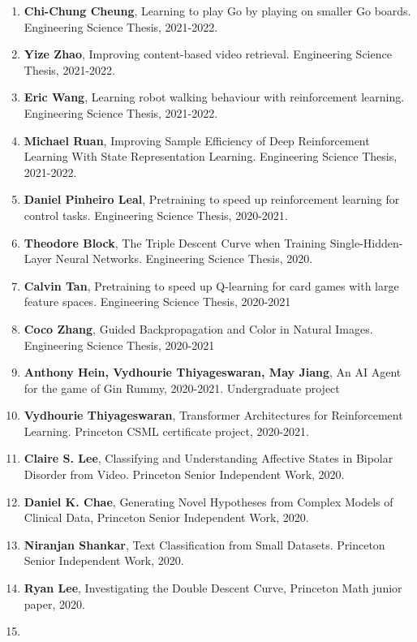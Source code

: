 \documentclass[letterpaper,11pt]{article}
\begin{document}
\begin{enumerate}
\item
\textbf{Chi-Chung Cheung}, Learning to play Go by playing on smaller Go boards.  Engineering Science Thesis, 2021-2022. 

\item
\textbf{Yize Zhao},   Improving content-based video retrieval. Engineering Science Thesis, 2021-2022. 

\item
\textbf{Eric Wang}, Learning robot walking behaviour with reinforcement learning. Engineering Science Thesis, 2021-2022. 


\item
\textbf{Michael Ruan}, Improving Sample Efficiency of Deep Reinforcement Learning With
State Representation Learning. Engineering Science Thesis, 2021-2022. 


\item
	\textbf{Daniel Pinheiro Leal},  Pretraining to speed up reinforcement learning for control tasks. Engineering Science Thesis, 2020-2021. 
\item
	\textbf{Theodore Block}, The Triple Descent Curve when Training Single-Hidden-Layer Neural Networks. Engineering Science Thesis, 2020. 
\item
	\textbf{Calvin Tan},  Pretraining to speed up Q-learning for card games with large feature spaces. Engineering Science Thesis, 2020-2021 
\item
	\textbf{Coco Zhang}, Guided Backpropagation and Color in Natural Images. Engineering Science Thesis, 2020-2021
\item
	\textbf{Anthony Hein, Vydhourie Thiyageswaran, May Jiang}, An AI Agent for the game of Gin Rummy, 2020-2021. Undergraduate project
\item
	\textbf{Vydhourie Thiyageswaran}, Transformer Architectures for Reinforcement Learning. Princeton CSML certificate project, 2020-2021.
\item
	\textbf{Claire S. Lee}, Classifying and Understanding Affective States in Bipolar Disorder from Video. Princeton Senior Independent Work, 2020.
\item
	\textbf{Daniel K. Chae}, Generating Novel Hypotheses from Complex Models of Clinical Data, Princeton Senior Independent Work, 2020.
\item
	\textbf{Niranjan Shankar}, Text Classification from Small Datasets. Princeton Senior Independent Work, 2020.
\item
	\textbf{Ryan Lee}, Investigating the Double Descent Curve, Princeton Math junior paper, 2020. 
\item

\end{enumerate}
\end{document}
